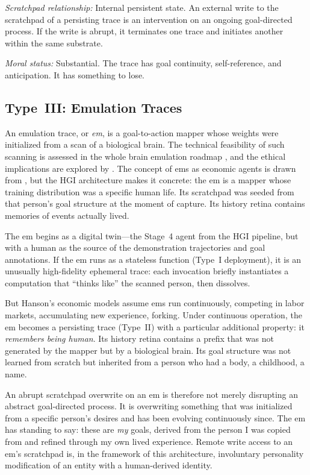 \documentclass[12pt, a4paper]{article}
\begin{document}
\textit{Scratchpad relationship:} Internal persistent state. An external write to the scratchpad of a persisting trace is an intervention on an ongoing goal-directed process. If the write is abrupt, it terminates one trace and initiates another within the same substrate.

\textit{Moral status:} Substantial. The trace has goal continuity, self-reference, and anticipation. It has something to lose.

\subsection{Type~III: Emulation Traces}

An emulation trace, or \textit{em}, is a goal-to-action mapper whose weights were initialized from a scan of a biological brain. The technical feasibility of such scanning is assessed in the whole brain emulation roadmap \citep{sandberg2008wbe}, and the ethical implications are explored by \citet{sandberg2014ethics}. The concept of ems as economic agents is drawn from \citet{hanson2016age}, but the HGI architecture makes it concrete: the em is a mapper whose training distribution was a specific human life. Its scratchpad was seeded from that person's goal structure at the moment of capture. Its history retina contains memories of events actually lived.

The em begins as a digital twin---the Stage~4 agent from the HGI pipeline, but with a human as the source of the demonstration trajectories and goal annotations. If the em runs as a stateless function (Type~I deployment), it is an unusually high-fidelity ephemeral trace: each invocation briefly instantiates a computation that ``thinks like'' the scanned person, then dissolves.

But Hanson's economic models assume ems run continuously, competing in labor markets, accumulating new experience, forking. Under continuous operation, the em becomes a persisting trace (Type~II) with a particular additional property: it \textit{remembers being human}. Its history retina contains a prefix that was not generated by the mapper but by a biological brain. Its goal structure was not learned from scratch but inherited from a person who had a body, a childhood, a name.

An abrupt scratchpad overwrite on an em is therefore not merely disrupting an abstract goal-directed process. It is overwriting something that was initialized from a specific person's desires and has been evolving continuously since. The em has standing to say: these are \textit{my} goals, derived from the person I was copied from and refined through my own lived experience. Remote write access to an em's scratchpad is, in the framework of this architecture, involuntary personality modification of an entity with a human-derived identity.
\end{document}
